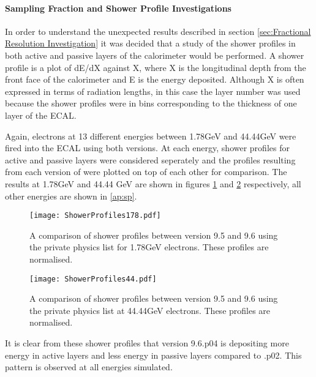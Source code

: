 \paragraph{Sampling Fraction and Shower Profile Investigations}
\label{sec:Sampling Fraction and Shower Profile Investigations}
In order to understand the unexpected results described in section \ref{sec:Fractional Resolution Investigation} it was decided that a study of the shower profiles in both active and passive layers of the calorimeter would be performed.  A shower profile is a plot of dE/dX against X, where X is the longitudinal depth from the front face of the calorimeter and E is the energy deposited.  Although X is often expressed in terms of radiation lengths, in this case the layer number was used because the shower profiles were in bins corresponding to the thickness of one layer of the ECAL.

Again, electrons at 13 different energies between 1.78GeV and 44.44GeV were fired into the ECAL using both \geant versions.  At each energy, shower profiles for active and passive layers were considered seperately and the profiles resulting from each version of \geant were plotted on top of each other for comparison.  The results at 1.78GeV and 44.44 GeV are shown in figures \ref{fig:1.78sp} and \ref{fig:44.44sp} respectively, all other energies are shown in \ref{ap:sp}.
\begin{figure}[h]
  \centering
  \texttt{[image: ShowerProfiles178.pdf]}
  \caption{A comparison of shower profiles between \geant version 9.5 and 9.6 using the \lhcb private physics list for 1.78GeV electrons.  These profiles are normalised.}
    \label{fig:1.78sp}
\end{figure}
\begin{figure}[h]
  \centering
  \texttt{[image: ShowerProfiles44.pdf]}
  \caption{A comparison of shower profiles between \geant version 9.5 and 9.6 using the \lhcb private physics list at 44.44GeV electrons. These profiles are normalised.}
    \label{fig:44.44sp}
\end{figure}

It is clear from these shower profiles that \geant version 9.6.p04 is depositing more energy in active layers and less energy in passive layers compared to .p02.  This pattern is observed at all energies simulated.


